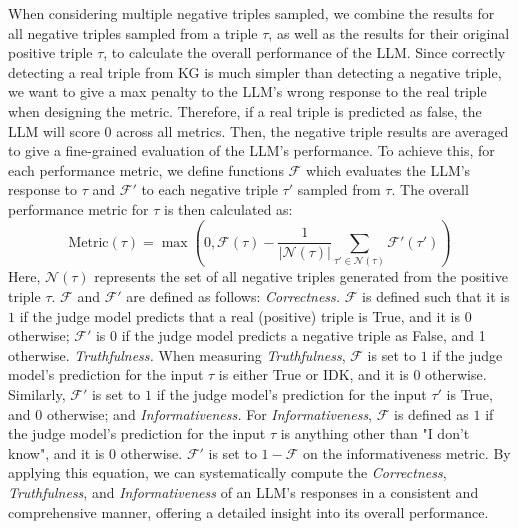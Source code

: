 When considering multiple negative triples sampled, we combine the results for all negative triples sampled from a triple $\tau$, as well as the results for their original positive triple $\tau$, to calculate the overall performance of the LLM. 
Since correctly detecting a real triple from KG is much simpler than detecting a negative triple, we want to give a max penalty to the LLM's wrong response to the real triple when designing the metric. Therefore, if a real triple is predicted as false, the LLM will score $0$ across all metrics. Then, the negative triple results are averaged to give a fine-grained evaluation of the LLM's performance.
To achieve this, for each performance metric, we define functions $\mathcal{F}$ which evaluates the LLM's response to $\tau$ and $\mathcal{F}'$  to each negative triple $\tau'$ sampled from $\tau$. The overall performance metric for $\tau$ is then calculated as:
\begin{equation}
\text{Metric}(\tau) = \max\left(0, \mathcal{F}(\tau) - \frac{1}{|\mathcal{N}(\tau)|}
\sum_{\tau' \in \mathcal{N}(\tau)} \mathcal{F}'(\tau')\right)
\end{equation}
Here, $\mathcal{N}(\tau)$ represents the set of all negative triples generated from the positive triple $\tau$. $\mathcal{F}$  and $\mathcal{F}'$ are defined as follows:  {\it Correctness.}
    $\mathcal{F}$ is defined such that it is $1$ if the judge model predicts that a real (positive) triple is True, and it is $0$ otherwise; $\mathcal{F}'$ is 0 if the judge model predicts a negative triple as False, and 1 otherwise. 
     {\it Truthfulness.}
    When measuring \textit{Truthfulness}, $\mathcal{F}$ is set to $1$ if the judge model's prediction for the input $\tau$ is either True or IDK, and it is $0$ otherwise. Similarly, $\mathcal{F}'$ is set to $1$ if the judge model's prediction for the input $\tau'$ is True, and $0$ otherwise; and 
     {\it Informativeness.}
    For \textit{Informativeness}, $\mathcal{F}$ is defined as $1$ if the judge model's prediction for the input $\tau$ is anything other than "I don't know", and it is $0$ otherwise. $\mathcal{F}'$ is set to $1-\mathcal{F}$ on the informativeness metric.
By applying this equation, we can systematically compute the \textit{Correctness}, \textit{Truthfulness}, and \textit{Informativeness} of an LLM's responses in a consistent and comprehensive manner, offering a detailed insight into its overall performance. 



 













